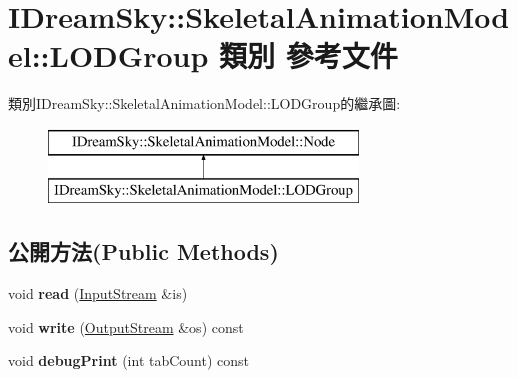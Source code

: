 \hypertarget{class_i_dream_sky_1_1_skeletal_animation_model_1_1_l_o_d_group}{}\section{I\+Dream\+Sky\+:\+:Skeletal\+Animation\+Model\+:\+:L\+O\+D\+Group 類別 參考文件}
\label{class_i_dream_sky_1_1_skeletal_animation_model_1_1_l_o_d_group}
類別\+I\+Dream\+Sky\+:\+:Skeletal\+Animation\+Model\+:\+:L\+O\+D\+Group的繼承圖\+:\begin{figure}[H]
\begin{center}
\leavevmode
\includegraphics[height=2.000000cm]{class_i_dream_sky_1_1_skeletal_animation_model_1_1_l_o_d_group}
\end{center}
\end{figure}
\subsection*{公開方法(Public Methods)}
\begin{DoxyCompactItemize}
\item 
void {\bfseries read} (\hyperlink{class_i_dream_sky_1_1_input_stream}{Input\+Stream} \&is)\hypertarget{class_i_dream_sky_1_1_skeletal_animation_model_1_1_l_o_d_group_aa427d49ac561f49c7fcdbf1b62c31620}{}\label{class_i_dream_sky_1_1_skeletal_animation_model_1_1_l_o_d_group_aa427d49ac561f49c7fcdbf1b62c31620}

\item 
void {\bfseries write} (\hyperlink{class_i_dream_sky_1_1_output_stream}{Output\+Stream} \&os) const \hypertarget{class_i_dream_sky_1_1_skeletal_animation_model_1_1_l_o_d_group_af7c5a12440892ce84e2f99e70ce11fed}{}\label{class_i_dream_sky_1_1_skeletal_animation_model_1_1_l_o_d_group_af7c5a12440892ce84e2f99e70ce11fed}

\item 
void {\bfseries debug\+Print} (int tab\+Count) const \hypertarget{class_i_dream_sky_1_1_skeletal_animation_model_1_1_l_o_d_group_aa838355fc1f20b3cef7d9d7705928ab0}{}\label{class_i_dream_sky_1_1_skeletal_animation_model_1_1_l_o_d_group_aa838355fc1f20b3cef7d9d7705928ab0}

\end{DoxyCompactItemize}
